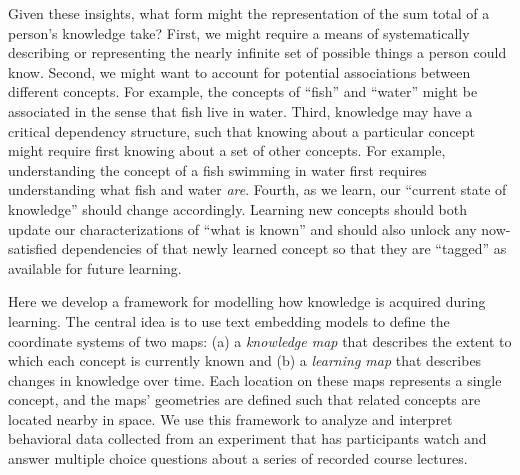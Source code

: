 \documentclass[10pt]{article}
\begin{document}
Given these insights, what form might the representation of the sum total of a
person's knowledge take? First, we might require a means of systematically
describing or representing the nearly infinite set of possible things a person
could know. Second, we might want to account for potential associations between
different concepts. For example, the concepts of ``fish'' and ``water'' might
be associated in the sense that fish live in water. Third, knowledge may have a
critical dependency structure, such that knowing about a particular concept
might require first knowing about a set of other concepts. For example,
understanding the concept of a fish swimming in water first requires
understanding what fish and water \textit{are}. Fourth, as we learn, our
``current state of knowledge'' should change accordingly. Learning new concepts
should both update our characterizations of ``what is known'' and should also
unlock any now-satisfied dependencies of that newly learned concept so that
they are ``tagged'' as available for future learning.

Here we develop a framework for modelling how knowledge is acquired during
learning. The central idea is to use text embedding models to define the
coordinate systems of two maps: (a) a \textit{knowledge map} that describes the
extent to which each concept is currently known and (b) a \textit{learning map}
that describes changes in knowledge over time. Each location on these maps
represents a single concept, and the maps' geometries are defined such that
related concepts are located nearby in space. We use this framework to analyze
and interpret behavioral data collected from an experiment that has
participants watch and answer multiple choice questions about a series of
recorded course lectures.
\end{document}
